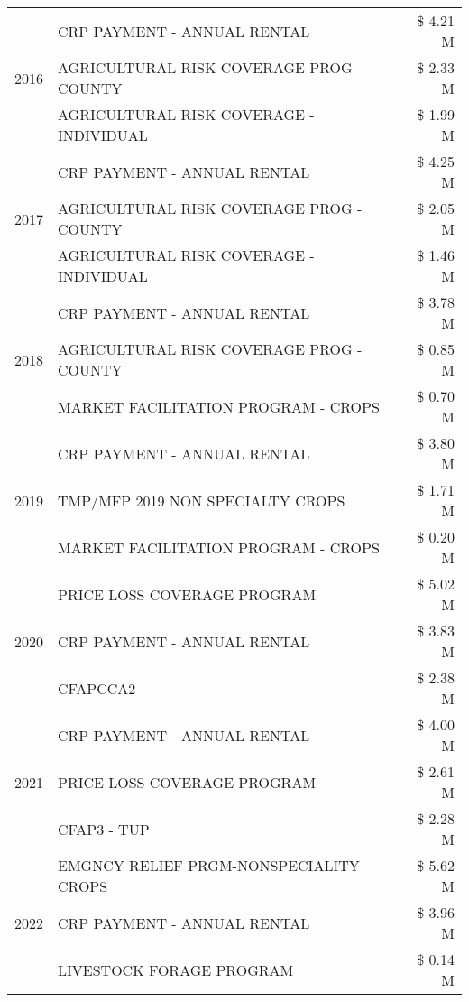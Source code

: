 \begin{tabular}{llr}
\cline{1-3}
\multirow[t]{3}{*}{2016} & CRP PAYMENT - ANNUAL RENTAL & \$ 4.21 M \\
 & AGRICULTURAL RISK COVERAGE PROG - COUNTY & \$ 2.33 M \\
 & AGRICULTURAL RISK COVERAGE - INDIVIDUAL & \$ 1.99 M \\
\cline{1-3}
\multirow[t]{3}{*}{2017} & CRP PAYMENT - ANNUAL RENTAL & \$ 4.25 M \\
 & AGRICULTURAL RISK COVERAGE PROG - COUNTY & \$ 2.05 M \\
 & AGRICULTURAL RISK COVERAGE - INDIVIDUAL & \$ 1.46 M \\
\cline{1-3}
\multirow[t]{3}{*}{2018} & CRP PAYMENT - ANNUAL RENTAL & \$ 3.78 M \\
 & AGRICULTURAL RISK COVERAGE PROG - COUNTY & \$ 0.85 M \\
 & MARKET FACILITATION PROGRAM - CROPS & \$ 0.70 M \\
\cline{1-3}
\multirow[t]{3}{*}{2019} & CRP PAYMENT - ANNUAL RENTAL & \$ 3.80 M \\
 & TMP/MFP 2019 NON SPECIALTY CROPS & \$ 1.71 M \\
 & MARKET FACILITATION PROGRAM - CROPS & \$ 0.20 M \\
\cline{1-3}
\multirow[t]{3}{*}{2020} & PRICE LOSS COVERAGE PROGRAM & \$ 5.02 M \\
 & CRP PAYMENT - ANNUAL RENTAL & \$ 3.83 M \\
 & CFAPCCA2 & \$ 2.38 M \\
\cline{1-3}
\multirow[t]{3}{*}{2021} & CRP PAYMENT - ANNUAL RENTAL & \$ 4.00 M \\
 & PRICE LOSS COVERAGE PROGRAM & \$ 2.61 M \\
 & CFAP3 - TUP & \$ 2.28 M \\
\cline{1-3}
\multirow[t]{3}{*}{2022} & EMGNCY RELIEF PRGM-NONSPECIALITY CROPS & \$ 5.62 M \\
 & CRP PAYMENT - ANNUAL RENTAL & \$ 3.96 M \\
 & LIVESTOCK FORAGE PROGRAM & \$ 0.14 M \\
\cline{1-3}
\bottomrule
\end{tabular}

